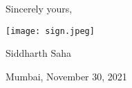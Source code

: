 \documentclass[12pt]{article}
\begin{document}

\vspace{10pt}
\noindent Sincerely yours, \par
\texttt{[image: sign.jpeg]}\par
\noindent Siddharth Saha \par
\noindent Mumbai, November 30, 2021
\end{document}
